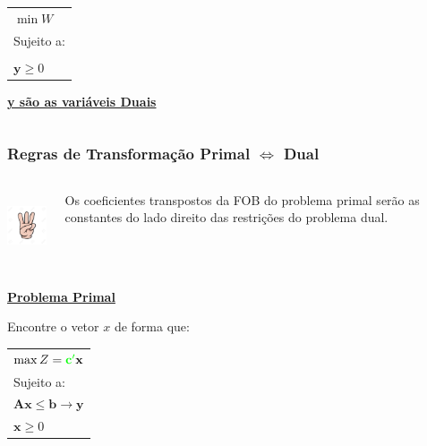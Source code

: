\documentclass{beamer}
\begin{document}
\begin{frame}
\begin{columns}
\begin{column}{4cm}
\begin{mdframed}[backgroundcolor=red!50]
				\begin{table}
					\begin{tabular}{l}
						\color{green} $ \min W $ \\
						\color{green} Sujeito a: \\
						 \\
						\color{green} $ \mathbf{y} \ge 0$ \\
					\end{tabular}
				\end{table}
			\end{mdframed}
			\underline{\textbf{y são as variáveis Duais}}
		\end{column}
	\end{columns}
\end{frame}

\begin{frame}
	\frametitle{Regras de Transformação Primal $\Leftrightarrow$ Dual}
	\begin{columns}
		\begin{column}{2cm}
			\includegraphics[width=2cm,height=2cm]{number_3.jpg}
		\end{column}
		\begin{column}{8cm}
			\begin{mdframed}[backgroundcolor=green!70]
				\centering
				Os coeficientes transpostos da FOB do problema primal serão as constantes do lado direito das restrições do problema dual.
			\end{mdframed}
		\end{column}
	\end{columns}
	\begin{columns}
		\centering
		\begin{column}{4cm}
			\underline{\textbf{Problema Primal}}
			\begin{mdframed}[backgroundcolor=blue!50]
				Encontre o vetor \textbf{$x$} de forma que:
				\begin{table}
					\begin{tabular}{l}
						$ \max Z = \mathbf{{\color{green}c'}x}$ \\
						Sujeito a: \\
						$ \mathbf{Ax} \le \mathbf{b} \rightarrow \mathbf{y} $ \\
						$ \mathbf{x} \ge 0$ \\

\end{tabular}
\end{table}
\end{mdframed}
\end{column}
\end{columns}
\end{frame}
\end{document}
